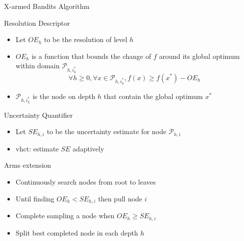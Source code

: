 \documentclass[9pt]{beamer}
\begin{document}
\begin{frame}{X-armed Bandits Algorithm}
    \begin{block}{Resolution Descriptor}
        \begin{itemize}
            \item Let $OE_h$ to be the \alert{resolution} of level $h$
            \item $OE_h$ is a function that bounds the change of $f$ around its global optimum within domain $\mathcal{P}_{h, i^*_h}$
                \begin{equation}
                    \forall h \ge 0, \forall x \in \mathcal{P}_{h, i^*_h}, f(x) \ge f(x^*) - OE_h
                \end{equation}
            \item $\mathcal{P}_{h, i^*_h}$ is the node on depth $h$ that contain the global optimum $x^*$
        \end{itemize}
    \end{block}
    \begin{block}{Uncertainty Quantifier}
        \begin{itemize}
            \item Let $SE_{h, i}$ to be the \alert{uncertainty estimate} for node $\mathcal{P}_{h, i}$
            \item \gls{vhct}: estimate $SE$ adaptively
        \end{itemize}
    \end{block}
    \begin{block}{Arms extension}
        \begin{itemize}
            \item Continuously search nodes from root to leaves
            \item Until finding $OE_h < SE_{h, i}$ then pull node $i$
            \item Complete sampling a node when $OE_h \ge SE_{h, i}$
            \item Split best completed node in each depth $h$
        \end{itemize}
    \end{block}
\end{frame}
\end{document}
